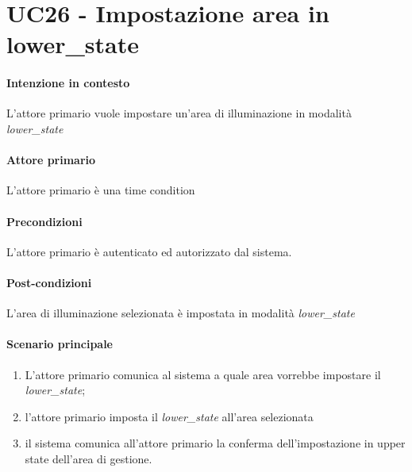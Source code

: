 \section{UC26 - Impostazione area in lower\_state}\label{uc:26}
\paragraph{Intenzione in contesto} L'attore primario vuole impostare un'area di illuminazione in modalità \textit{lower\_state}
\paragraph{Attore primario} L'attore primario è una time condition %
\paragraph{Precondizioni} L'attore primario è autenticato ed autorizzato dal sistema.
\paragraph{Post-condizioni} L'area di illuminazione selezionata è impostata in modalità \textit{lower\_state}
\paragraph{Scenario principale}
\begin{enumerate}
    \item L'attore primario comunica al sistema a quale area vorrebbe impostare il \textit{lower\_state};
    \item l'attore primario imposta il \textit{lower\_state} all'area selezionata
    \item il sistema comunica all'attore primario la conferma dell'impostazione in upper state dell'area di gestione.
\end{enumerate}